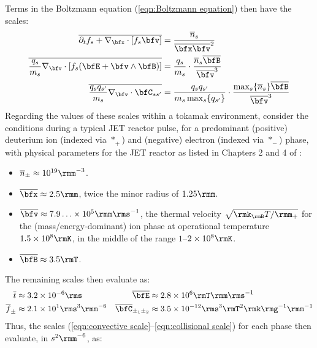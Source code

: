     Terms in the Boltzmann equation (\ref{eqn:Boltzmann equation}) then have the scales:
    \begin{align}
        \overline{\partial_{t}f_{s} + \nabla_{\bfx}\cdot[f_{s}\bfv]}  &=  \frac{\overline{n}_{s}}{\overline{\bfx}\overline{\bfv}^{2}}  \label{eqn:convective scale}  \\
        \overline{\frac{q_{s}}{m_{s}}\nabla_{\bfv}\cdot[f_{s}(\bfE + \bfv\wedge\bfB)]}  &=  \frac{q_{s}}{m_{s}}\cdot\frac{\overline{n}_{s}\overline{\bfB}}{\overline{\bfv}^{3}}  \\
        \overline{\frac{q_{s}q_{s'}}{m_{s}}\nabla_{\bfv}\cdot\bfC_{ss'}}  &=  \frac{q_{s}q_{s'}}{m_{s}\max_{s}\{q_{s'}\}}\cdot\frac{\max_{s}\{\overline{n}_{s}\}\overline{\bfB}}{\overline{\bfv}^{3}}  \label{eqn:collisional scale}
    \end{align}
    Regarding the values of these scales within a tokamak environment, consider the conditions during a typical JET reactor pulse, for a predominant (positive) deuterium ion (indexed via $*_{+}$) and (negative) electron (indexed via $*_{-}$) phase, with physical parameters for the JET reactor as listed in Chapters 2 and 4 of \cite{Wes00}:
    \begin{itemize}
        \item  $\overline{n}_{\pm}  \approx  10^{19}\rmm^{- 3}$.
        \item  $\overline{\bfx}     \approx  2.5\rmm$, twice the minor radius of $1.25\rmm$.
        \item  $\overline{\bfv}     \approx  7.9\ldots\times 10^{5}\rmm\rms^{- 1}$, the thermal velocity $\sqrt{\rmk_{\rmB}T/\rmm_{+}}$ for the (mass/energy-dominant) ion phase at operational temperature $1.5\times 10^{8}\rmK$, in the middle of the range $1$–$2\times 10^{8}\rmK$.
        \item  $\overline{\bfB}     \approx  3.5\rmT$.
    \end{itemize}
    The remaining scales then evaluate as:
    \begin{align*}
        \overline{t}           &\approx  3.2\times 10^{- 6}\rms              &
        \overline{\bfE}        &\approx  2.8\times 10^{6}\rmT\rmm\rms^{- 1}  \\
        \overline{f}_{\pm}     &\approx  2.1\times 10^{1}\rms^{3}\rmm^{- 6}  &
        \overline{\bfC}_{\pm_{1}\pm_{2}}  &\approx  3.5\times 10^{- 12}\rms^{3}\rmT^{2}\rmk\rmg^{- 1}\rmm^{- 1}
    \end{align*}
    Thus, the scales (\ref{eqn:convective scale}–\ref{eqn:collisional scale}) for each phase then evaluate, in $s^{2}\rmm^{- 6}$, as:
